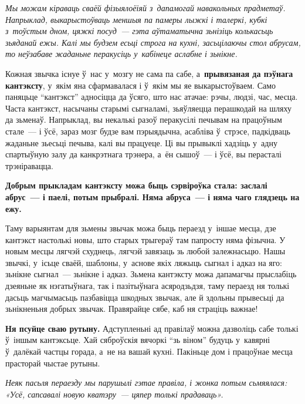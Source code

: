 \emph{Мы можам кіраваць сваёй фізыялоёіяй з~дапамогай навакольных прадметаў. Напрыклад, выкарыстоўваць меншыя па памеры лыжкі і талеркі, кубкі з~тоўстым дном, цяжкі посуд~--- гэта аўтаматычна зьнізіць колькасьць зьяданай ежы. Калі мы будзем есьці строга на кухні, засьцілаючы стол абрусам, то неўзабаве жаданьне перакусіць у~кабінеце аслабне і зьнікне.}


Кожная звычка існуе ў~нас у~мозгу не сама па сабе, а~\textbf{прывязаная да пэўнага кантэксту}, у~якім яна сфармавалася і ў~якім мы яе выкарыстоўваем. Само паняцьце “кантэкст” адносіцца да ўсяго, што нас атачае: рэчы, людзі, час, месца. Часта кантэкст, насычаны старымі сыгналамі, зьяўляецца перашкодай на шляху да зьменаў. Напрыклад, вы некалькі разоў перакусілі печывам на працоўным стале~--- і ўсё, зараз мозг будзе вам пэрыядычна, асабліва ў~стрэсе, падкідваць жаданьне зьесьці печыва, калі вы працуеце. Ці вы прывыклі хадзіць у~адну спартыўную залу да канкрэтнага трэнера, а~ён сышоў~--- і ўсё, вы перасталі трэніравацца. 

\textbf{Добрым прыкладам кантэксту можа быць сэрвіроўка стала: заслалі абрус~--- і паелі, потым прыбралі. Няма абруса~--- і няма чаго глядзець на ежу.} 

Таму варыянтам для зьмены звычак можа быць пераезд у~іншае месца, дзе кантэкст настолькі новы, што старых трыгераў там папросту няма фізычна. У новым месцы лягчэй схуднець, лягчэй завязаць зь любой залежнасьцю. Нашы звычкі, у~ісьце сваёй, шаблоны, у~аснове якіх ляжыць сыгнал і адказ на яго: зьнікне сыгнал~--- зьнікне і адказ. Зьмена кантэксту можа дапамагчы прыслабіць дзеяньне як нэгатыўнага, так і пазітыўнага асяродзьдзя, таму пераезд ня толькі дасьць магчымасьць пазбавіцца шкодных звычак, але й здольны прывесьці да зьнікненьня добрых звычак. Правярайце сябе, каб ня страціць важнае! 

\textbf{Ня псуйце сваю рутыну.} Адступленьні ад правілаў можна дазволіць сабе толькі ў~іншым кантэксьце. Хай сяброўскія вячоркі ``зь віном'' будуць у~кавярні ў~далёкай частцы горада, а~не на вашай кухні. Пакіньце дом і працоўнае месца прасторай чыстае рутыны.

\emph{Неяк пасьля пераезду мы парушылі гэтае правіла, і жонка потым сьмяялася: «Усё, сапсавалі новую кватэру~--- цяпер толькі прадаваць».}

